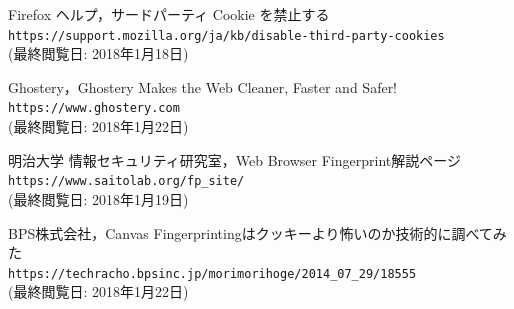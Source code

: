\documentclass[10pt, a4paper]{jreport}
\begin{document}
\begin{thebibliography}{n}
 Firefox ヘルプ，サードパーティ Cookie を禁止する\\
\verb|https://support.mozilla.org/ja/kb/disable-third-party-cookies|\\
(最終閲覧日: 2018年1月18日)

 Ghostery，Ghostery Makes the Web Cleaner, Faster and Safer!\\
\verb|https://www.ghostery.com|\\
(最終閲覧日: 2018年1月22日)

 明治大学 情報セキュリティ研究室，Web Browser Fingerprint解説ページ\\
\verb|https://www.saitolab.org/fp_site/|\\
(最終閲覧日: 2018年1月19日)

 BPS株式会社，Canvas Fingerprintingはクッキーより怖いのか技術的に調べてみた\\
\verb|https://techracho.bpsinc.jp/morimorihoge/2014_07_29/18555|\\
(最終閲覧日: 2018年1月22日)

\end{thebibliography}

\end{document}
